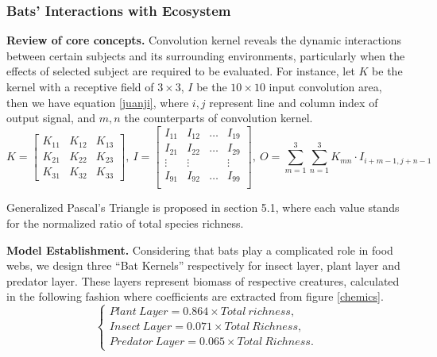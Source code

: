 \documentclass[12pt]{article}
\begin{document}
\subsubsection{Bats' Interactions with Ecosystem}
\hspace{1.5em}\textbf{Review of core concepts.} Convolution kernel reveals the dynamic interactions between certain subjects and its surrounding environments, particularly when the effects of selected subject are required to be evaluated. 
For instance, let $K$ be the kernel with a receptive field of $3\times 3$, $I$ be the $10\times 10$ input convolution area, then we have equation \eqref{juanji}, where $i,j$ represent line and column index of output signal, and $m,n$ the counterparts of convolution kernel.  
\begin{equation}
	K=\begin{bmatrix}
	K_{11} & K_{12} & K_{13} \\
	K_{21} & K_{22} & K_{23} \\
	K_{31} & K_{32} & K_{33} 
\end{bmatrix},\ I=\begin{bmatrix}
	I_{11} & I_{12} & \dots & I_{19} \\
	I_{21} & I_{22} & \dots & I_{29} \\
	\vdots & \vdots & 		& \vdots \\
	I_{91} & I_{92} & \dots & I_{99} \\
\end{bmatrix},\ O=\sum_{m=1}^{3}\sum_{n=1}^{3}K_{mn}\cdot I_{i+m-1,j+n-1}
\label{juanji}
\end{equation}


Generalized Pascal's Triangle is proposed in section 5.1, where each value stands for the normalized ratio of total species richness.

\textbf{Model Establishment. }Considering that bats play a complicated role in food webs, we design three ``Bat Kernels'' respectively for insect layer, plant layer and predator layer. These layers represent biomass of respective creatures, calculated in the following fashion  where coefficients are extracted from figure \ref{chemics}.
\begin{equation}
	\begin{cases}
Plant\ Layer = 0.864\times Total\ richness, \\ Insect\ Layer = 0.071\times Total\ Richness, \\ Predator\ Layer = 0.065\times  Total\ Richness.
	\end{cases}\label{ca}
\end{equation}
\end{document}
